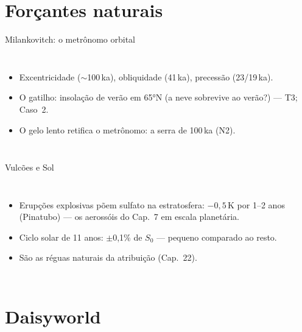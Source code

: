 \documentclass[aspectratio=169,11pt]{beamer}
\begin{document}
\section{Forçantes naturais}

\begin{frame}{Milankovitch: o metrônomo orbital}
  \begin{columns}
    \begin{itemize}
      \item Excentricidade ($\sim$100\,ka), obliquidade (41\,ka),
            precessão (23/19\,ka).
      \item O gatilho: insolação de verão em 65°N (a neve sobrevive
            ao verão?) — T3; Caso~2.
      \item O gelo lento retifica o metrônomo: a serra de 100\,ka
            (N2).
    \end{itemize}
  \end{columns}
\end{frame}

\begin{frame}{Vulcões e Sol}
  \begin{columns}
    \begin{itemize}
      \item Erupções explosivas põem sulfato na estratosfera:
            $-0{,}5$\,K por 1--2 anos (Pinatubo) — os aerossóis do
            Cap.~7 em escala planetária.
      \item Ciclo solar de 11 anos: $\pm$0,1\% de $S_0$ — pequeno
            comparado ao resto.
      \item São as réguas naturais da atribuição (Cap.~22).
    \end{itemize}
  \end{columns}
\end{frame}

\section{Daisyworld}
\end{document}
